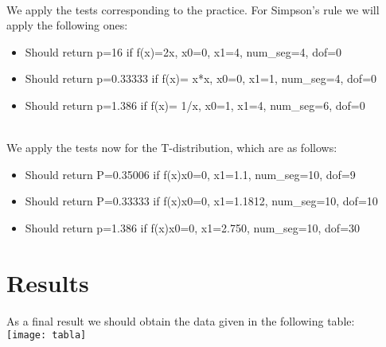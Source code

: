 \documentclass{article}
\begin{document}
{\\We apply the tests corresponding to the practice. For Simpson's rule we will apply the following ones:}
\begin{itemize}
\item Should return p=16 if f(x)=2x, x0=0, x1=4, num\_seg=4, dof=0
\item Should return p=0.33333 if f(x)= x*x, x0=0, x1=1, num\_seg=4, dof=0
\item Should return p=1.386 if f(x)= 1/x, x0=1, x1=4, num\_seg=6, dof=0
\end{itemize}
{\\We apply the tests now for the T-distribution, which are as follows: }
\begin{itemize}
\item Should return P=0.35006 if f(x)x0=0, x1=1.1, num\_seg=10, dof=9
\item Should return P=0.33333 if f(x)x0=0, x1=1.1812, num\_seg=10, dof=10
\item Should return p=1.386 if f(x)x0=0, x1=2.750, num\_seg=10, dof=30
\end{itemize}
\section{Results}
{As a final result we should obtain the data given in the following table:}\\
\texttt{[image: tabla]}
\end{document}
